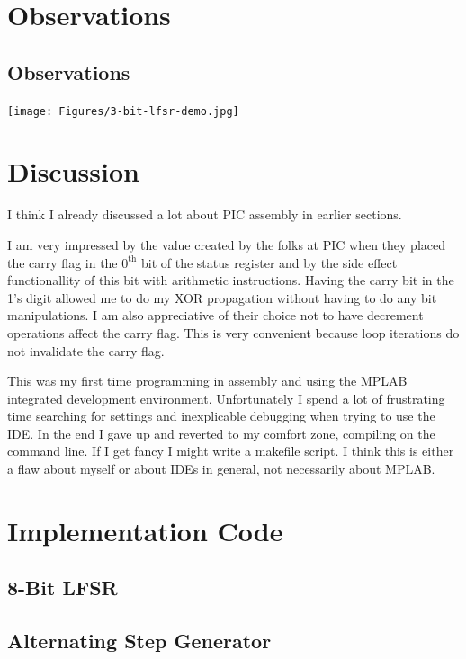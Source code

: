 \documentclass[11pt]{article}
\begin{document}
\section{Observations}

\subsection{Observations}

\begin{center}
	\texttt{[image: Figures/3-bit-lfsr-demo.jpg]}
	\label{3-bit-lfsr-demo-jpg}
\end{center}

\section{Discussion}

I think I already discussed a lot about PIC assembly in earlier sections.

I am very impressed by the value created by the folks at PIC when
they placed the carry flag in the $0^{\textrm{th}}$ bit of the status
register and by the side effect functionallity of this bit with arithmetic
instructions. Having the carry bit in the 1's digit allowed me to do
my XOR propagation without having to do any bit manipulations.
I am also appreciative of their choice not to have decrement operations
affect the carry flag. This is very convenient because loop iterations
do not invalidate the carry flag.

This was my first time programming in assembly and using the MPLAB
integrated development environment. Unfortunately I spend a lot of
frustrating time searching for settings and inexplicable debugging
when trying to use the IDE. In the end I gave up and reverted to my
comfort zone, compiling on the command line. If I get fancy I might
write a makefile script. I think this is either a flaw about myself
or about IDEs in general, not necessarily about MPLAB.

\clearpage
\section{Implementation Code}

\subsection{8-Bit LFSR}
\label{lfsr-code}




\clearpage
\subsection{Alternating Step Generator}
\label{asg-code}


\end{document}
